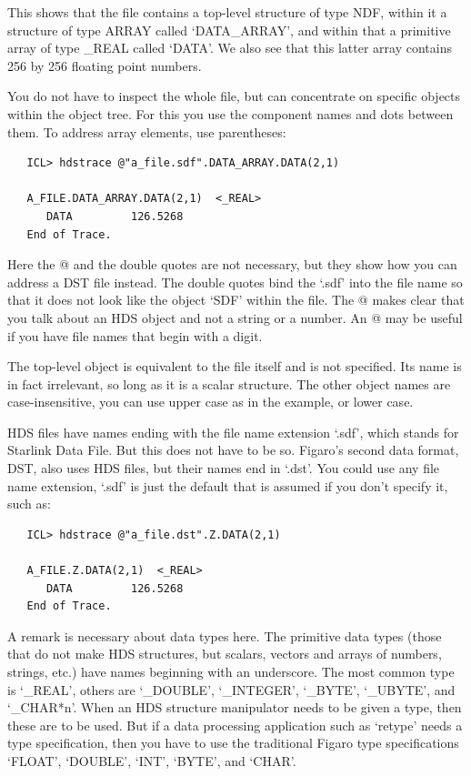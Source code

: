    This shows that the file contains a top-level structure of
   type NDF, within it a structure of type ARRAY called `DATA\_ARRAY',
   and within that a primitive array of type \_REAL called `DATA'. We
   also see that this latter array contains 256 by 256 floating point
   numbers.

   You do not have to inspect the whole file, but can concentrate on
   specific objects within the object tree. For this you use the
   component names and dots between them. To address array elements,
   use parentheses:

\begin{verbatim}
   ICL> hdstrace @"a_file.sdf".DATA_ARRAY.DATA(2,1)

   A_FILE.DATA_ARRAY.DATA(2,1)  <_REAL>
      DATA         126.5268
   End of Trace.
\end{verbatim}

   Here the @ and the double quotes are not necessary, but they show
   how you can address a DST file instead. The double quotes bind the
   `.sdf' into the file name so that it does not look like the object
   `SDF' within the file. The @ makes clear that you talk about an HDS
   object and not a string or a number. An @ may be useful if you have
   file names that begin with a digit.

   The top-level object is equivalent to the file itself and is not
   specified. Its name is in fact irrelevant, so long as it is a
   scalar structure. The other object names are case-insensitive, you
   can use upper case as in the example, or lower case.

   HDS files have names ending with the file name extension `.sdf',
   which stands for Starlink Data File. But this does not have to be so.
   Figaro's second data format, DST, also uses HDS files, but their
   names end in `.dst'. You could use any file name extension, `.sdf'
   is just the default that is assumed if you don't specify it, such
   as:

\begin{verbatim}
   ICL> hdstrace @"a_file.dst".Z.DATA(2,1)

   A_FILE.Z.DATA(2,1)  <_REAL>
      DATA         126.5268
   End of Trace.
\end{verbatim}

   A remark is necessary about data types here. The primitive data
   types (those that do not make HDS structures, but scalars, vectors
   and arrays of numbers, strings, etc.) have names beginning with an
   underscore. The most common type is `\_REAL', others are
   `\_DOUBLE', `\_INTEGER', `\_BYTE', `\_UBYTE', and `\_CHAR*n'. When
   an HDS structure manipulator needs to be given a type, then these
   are to be used. But if a data processing application such as
   `retype' needs a type specification, then you have to use the
   traditional Figaro type specifications `FLOAT', `DOUBLE', `INT',
   `BYTE', and `CHAR'.

